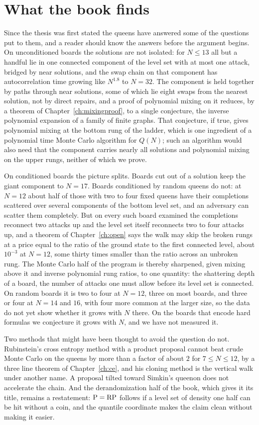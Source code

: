 \section{What the book finds}

Since the thesis was first stated the queens have answered some of the questions put to them, and a reader should know the answers before the argument begins. On unconditioned boards the solutions are not isolated: for $N \le 13$ all but a handful lie in one connected component of the level set with at most one attack, bridged by near solutions, and the swap chain on that component has autocorrelation time growing like $N^{1.8}$ to $N = 32$. The component is held together by paths through near solutions, some of which lie eight swaps from the nearest solution, not by direct repairs, and a proof of polynomial mixing on it reduces, by a theorem of Chapter~\ref{ch:mixingproof}, to a single conjecture, the inverse polynomial expansion of a family of finite graphs. That conjecture, if true, gives polynomial mixing at the bottom rung of the ladder, which is one ingredient of a polynomial time Monte Carlo algorithm for $Q(N)$; such an algorithm would also need that the component carries nearly all solutions and polynomial mixing on the upper rungs, neither of which we prove.

On conditioned boards the picture splits. Boards cut out of a solution keep the giant component to $N = 17$. Boards conditioned by random queens do not: at $N = 12$ about half of those with two to four fixed queens have their completions scattered over several components of the bottom level set, and an adversary can scatter them completely. But on every such board examined the completions reconnect two attacks up and the level set itself reconnects two to four attacks up, and a theorem of Chapter~\ref{ch:open} says the walk may skip the broken rungs at a price equal to the ratio of the ground state to the first connected level, about $10^{-3}$ at $N = 12$, some thirty times smaller than the ratio across an unbroken rung. The Monte Carlo half of the program is thereby sharpened, given mixing above it and inverse polynomial rung ratios, to one quantity: the shattering depth of a board, the number of attacks one must allow before its level set is connected. On random boards it is two to four at $N = 12$, three on most boards, and three or four at $N = 14$ and $16$, with four more common at the larger size, so the data do not yet show whether it grows with $N$ there. On the boards that encode hard formulas we conjecture it grows with $N$, and we have not measured it.

Two methods that might have been thought to avoid the question do not. Rubinstein's cross entropy method with a product proposal cannot beat crude Monte Carlo on the queens by more than a factor of about $2$ for $7 \le N \le 12$, by a three line theorem of Chapter~\ref{ch:ce}, and his cloning method is the vertical walk under another name. A proposal tilted toward Simkin's queenon does not accelerate the chain. And the derandomization half of the book, which gives it its title, remains a restatement: $\mathrm{P} = \mathrm{RP}$ follows if a level set of density one half can be hit without a coin, and the quantile coordinate makes the claim clean without making it easier.
